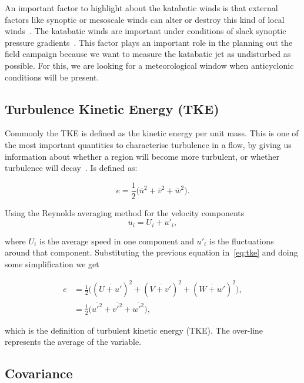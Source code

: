 \documentclass[a4paper,12pt]{article}
\begin{document}
An important factor to highlight about the katabatic winds is that external factors like synoptic or mesoscale winds can alter or destroy this kind of local winds~\citep{stull2012introduction}. The katabatic winds are important under conditions of slack synoptic pressure gradients~\citep{manins1979katabatic}. This factor plays an important role in the planning out the field campaign because we want to measure the katabatic jet as undisturbed as possible. For this, we are looking for a meteorological window when anticyclonic conditions will be present. 

\subsection{Turbulence Kinetic Energy (TKE)}
Commonly the TKE is defined as the kinetic energy per unit mass. This is one of the most important quantities to characterise turbulence in a flow, by giving us information about whether a region will become more turbulent, or whether turbulence will decay~\citep{stull2012introduction}.  Is defined as:

\begin{equation}
    e = \frac{1}{2} \big(\bar{u}^2 + \bar{v}^2 + \bar{w}^2\big). 
    \label{eq:tke}
\end{equation}

 Using the Reynolds averaging method for the velocity components
\begin{equation}
   u_i = U_i + u'_i,
   \label{eq:Re_avg}
\end{equation}


\noindent where $U_i$ is the average speed in one component and $u'_i$ is the fluctuations around that component. Substituting the previous equation in~\ref{eq:tke} and doing some simplification we get

\begin{subequations}
  \begin{align}
    e &= \frac{1}{2} \big((\overline{U + u'})^2 + (\overline{V + v'})^2 + (\overline{W + w'})^2 \big), \\
    &= \frac{1}{2} \big(\overline{u'^2} + \overline{v'^2} + \overline{w'^2}\big),
  \end{align}
  \label{eq:tke_2}
\end{subequations}

\noindent which is the definition of turbulent kinetic energy (TKE). The over-line represents the average of the variable. 

\subsection{Covariance}
\end{document}

